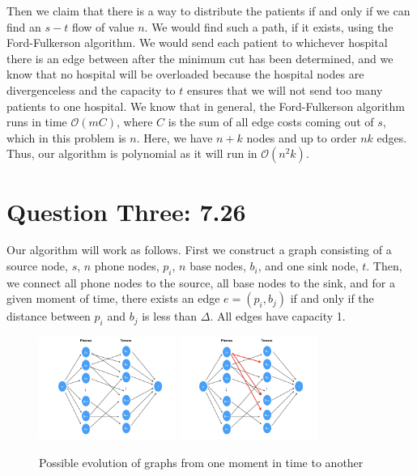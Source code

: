 \documentclass[11pt,letterpaper]{article}
\begin{document}
Then we claim that there is a way to distribute the patients if and only if we can find an $s-t$ flow of value $n$. We would find such a path, if it exists, using the Ford-Fulkerson algorithm. We would send each patient to whichever hospital there is an edge between after the minimum cut has been determined, and we know that no hospital will be overloaded because the hospital nodes are divergenceless and the capacity to $t$ ensures that we will not send too many patients to one hospital. We know that in general, the Ford-Fulkerson algorithm runs in time $\mathcal{O}(mC)$, where $C$ is the sum of all edge costs coming out of $s$, which in this problem is $n$. Here, we have $n+k$ nodes and up to order $nk$ edges. Thus, our algorithm is polynomial as it will run in $\mathcal{O}(n^2k)$.


\section*{Question Three: 7.26}

Our algorithm will work as follows. First we construct a graph consisting of a source node, $s$, $n$ phone nodes, $p_i$,  $n$ base nodes, $b_i$, and one sink node, $t$. Then, we connect all phone nodes to the source, all base nodes to the sink, and for a given moment of time, there exists an edge $e = (p_i, b_j)$ if and only if the distance between $p_i$ and $b_j$ is less than $\Delta$. All edges have capacity 1. 

\begin{figure}[h]
  \centering
  {\includegraphics[width=0.4\textwidth]{726_1.jpeg}
  \hfill
  \includegraphics[width=0.4\textwidth]{726_2.jpeg}\label{fig:f2}}
  \caption{Possible evolution of graphs from one moment in time to another}
\end{figure}
\end{document}
